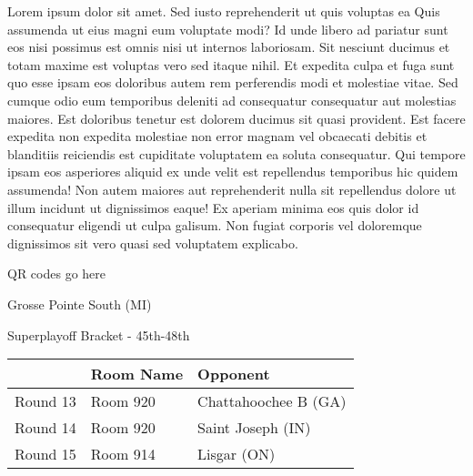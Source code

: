 \documentclass{article}%
\begin{document}
\vspace*{8pt}%
\linebreak%
\newline%
\newline%
Lorem ipsum dolor sit amet. Sed iusto reprehenderit ut quis voluptas ea Quis assumenda ut eius magni eum voluptate modi? Id unde libero ad pariatur sunt eos nisi possimus est omnis nisi ut internos laboriosam. Sit nesciunt ducimus et totam maxime est voluptas vero sed itaque nihil. Et expedita culpa et fuga sunt quo esse ipsam eos doloribus autem rem perferendis modi et molestiae vitae.\newline%
\newline%
Sed cumque odio eum temporibus deleniti ad consequatur consequatur aut molestias maiores. Est doloribus tenetur est dolorem ducimus sit quasi provident. Est facere expedita non expedita molestiae non error magnam vel obcaecati debitis et blanditiis reiciendis est cupiditate voluptatem ea soluta consequatur. Qui tempore ipsam eos asperiores aliquid ex unde velit est repellendus temporibus hic quidem assumenda!\newline%
\newline%
Non autem maiores aut reprehenderit nulla sit repellendus dolore ut illum incidunt ut dignissimos eaque! Ex aperiam minima eos quis dolor id consequatur eligendi ut culpa galisum. Non fugiat corporis vel doloremque dignissimos sit vero quasi sed voluptatem explicabo.\newline%
\newline%
%
\vspace*{30pt}%
\begin{center}%
\begin{Huge}%
QR codes go here%
\end{Huge}%
\end{center}%
\newpage%
\begin{center}%
\begin{Huge}%
Grosse Pointe South (MI)%
\end{Huge}%
\vspace*{8pt}%
\linebreak%
\begin{Large}%
Superplayoff Bracket {-} 45th{-}48th%
\end{Large}%
\end{center}%
%
\begin{tabularx}{\textwidth}{|c|Y|Y|}%
\hline%
&Room Name&Opponent\\%
\hline%
Round 13&Room 920&Chattahoochee B (GA)\\%
Round 14&Room 920&Saint Joseph (IN)\\%
Round 15&Room 914&Lisgar (ON)\\%
\hline%
\end{tabularx}%
\end{document}
